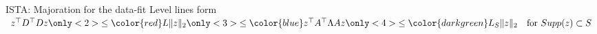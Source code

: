 \documentclass{beamer}
\begin{document}
\begin{frame}{ISTA: Majoration for the data-fit}
    \myitem{} Level lines form $z^\top D^\top D z
                       \only<2>{\le \color{red} L \|z\|_2}
                       \only<3>{\le \color{blue} z^\top A^\top \Lambda A z}
                       \only<4>{\le {\color{darkgreen} L_S \|z\|_2}
                            ~~ \text{ for } Supp(z) \subset S}$
              \\
    \centering
\end{frame}
\end{document}
